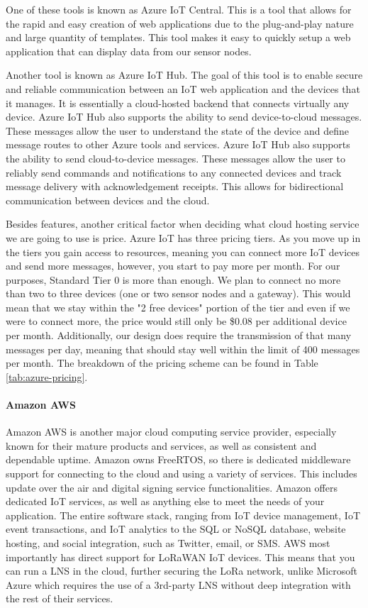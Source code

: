One of these tools is known as Azure IoT Central. This is a tool that allows for the rapid and easy creation of web applications due to the plug-and-play nature and large quantity of templates. This tool makes it easy to quickly setup a web application that can display data from our sensor nodes.

Another tool is known as Azure IoT Hub. The goal of this tool is to enable secure and reliable communication between an IoT web application and the devices that it manages. It is essentially a cloud-hosted backend that connects virtually any device. Azure IoT Hub also supports the ability to send device-to-cloud messages. These messages allow the user to understand the state of the device and define message routes to other Azure tools and services. Azure IoT Hub also supports the ability to send cloud-to-device messages. These messages allow the user to reliably send commands and notifications to any connected devices and track message delivery with acknowledgement receipts. This allows for bidirectional communication between devices and the cloud.

Besides features, another critical factor when deciding what cloud hosting service we are going to use is price. Azure IoT has three pricing tiers. As you move up in the tiers you gain access to resources, meaning you can connect more IoT devices and send more messages, however, you start to pay more per month. For our purposes, Standard Tier 0 is more than enough. We plan to connect no more than two to three devices (one or two sensor nodes and a gateway). This would mean that we stay within the "2 free devices" portion of the tier and even if we were to connect more, the price would still only be \$0.08 per additional device per month. Additionally, our design does require the transmission of that many messages per day, meaning that should stay well within the limit of 400 messages per month. The breakdown of the pricing scheme can be found in Table \ref{tab:azure-pricing}.



\paragraph{Amazon AWS}
Amazon AWS is another major cloud computing service provider, especially known for their mature
products and services, as well as consistent and dependable uptime. Amazon owns FreeRTOS, so there
is dedicated middleware support for connecting to the cloud and using a variety of services. This
includes update over the air and digital signing service functionalities. Amazon offers dedicated
IoT services, as well as anything else to meet the needs of your application. The entire software
stack, ranging from IoT device management, IoT event transactions, and IoT analytics to the SQL or
NoSQL database, website hosting, and social integration, such as Twitter, email, or SMS. AWS most
importantly has direct support for LoRaWAN IoT devices. This means that you can run a LNS in the
cloud, further securing the LoRa network, unlike Microsoft Azure which requires the use of
a 3rd-party LNS without deep integration with the rest of their services. 

